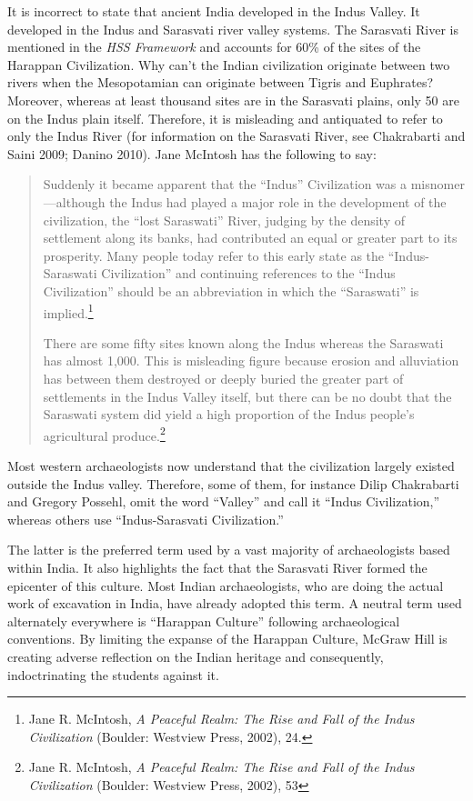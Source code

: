 It is incorrect to state that ancient India developed in the Indus Valley. It developed in the Indus and Sarasvati river valley systems. The Sarasvati River is mentioned in the \textit{HSS Framework} and accounts for 60\% of the sites of the Harappan Civilization. Why can’t the Indian civilization originate between two rivers when the Mesopotamian can originate between Tigris and Euphrates? Moreover, whereas at least thousand sites are in the Sarasvati plains, only 50 are on the Indus plain itself. Therefore, it is misleading and antiquated to refer to only the Indus River (for information on the Sarasvati River, see Chakrabarti and Saini 2009; Danino 2010). Jane McIntosh has the following to say: 
\begin{quotation}
\noindent Suddenly it became apparent that the “Indus” Civilization was a misnomer—although the Indus had played a major role in the development of the civilization, the “lost Saraswati” River, judging by the density of settlement along its banks, had contributed an equal or greater part to its prosperity. Many people today refer to this early state as the “Indus-Saraswati Civilization” and continuing references to the “Indus Civilization” should be an abbreviation in which the “Saraswati” is implied.\footnote{Jane 	R. McIntosh, \textit{A Peaceful Realm: The Rise and Fall of the Indus Civilization} (Boulder: Westview Press, 2002), 24.}
\bigskip

There are some fifty sites known along the Indus whereas the Saraswati has almost 1,000. This is misleading figure because erosion and alluviation has between them destroyed or deeply buried the greater part of settlements in the Indus Valley itself, but there can be no doubt that the Saraswati system did yield a high proportion of the Indus people’s agricultural produce.\footnote{Jane R. McIntosh, \textit{A Peaceful Realm: The Rise and Fall of the Indus Civilization} (Boulder: Westview Press, 2002), 53}
\end{quotation}
Most western archaeologists now understand that the civilization largely existed outside the Indus valley. Therefore, some of them, for instance Dilip Chakrabarti and Gregory Possehl, omit the word “Valley” and call it “Indus Civilization,” whereas others use “Indus-Sarasvati Civilization.” 

The latter is the preferred term used by a vast majority of archaeologists based within India. It also highlights the fact that the Sarasvati River formed the epicenter of this culture. Most Indian archaeologists, who are doing the actual work of excavation in India, have already adopted this term. A neutral term used alternately everywhere is “Harappan Culture” following archaeological conventions. By limiting the expanse of the Harappan Culture, McGraw Hill is creating adverse reflection on the Indian heritage and consequently, indoctrinating the students against it. 

